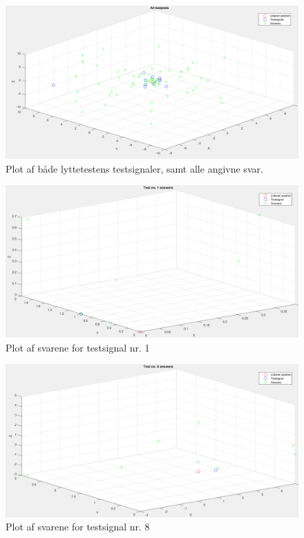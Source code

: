 \begin{figure}[h!]
	\centering
	\includegraphics[width=1\linewidth]{All_Pics/allplots}
	\caption{Plot af både lyttetestens testsignaler, samt alle angivne svar.}
	\label{fig:allplots}
\end{figure}

\begin{figure}[h]
	\centering
	\includegraphics[width=1\linewidth]{All_Pics/test1plot}
	\caption{Plot af svarene for testsignal nr. 1}
	\label{fig:test1plot}
\end{figure}

\begin{figure}[h]
	\centering
	\includegraphics[width=1\linewidth]{All_Pics/test8plot}
	\caption{Plot af svarene for testsignal nr. 8}
	\label{fig:test8plot}
\end{figure}


